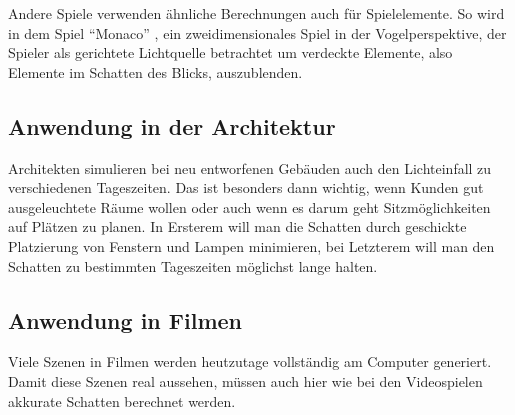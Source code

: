 Andere Spiele verwenden ähnliche Berechnungen auch für Spielelemente. So wird in dem Spiel "`Monaco"' \cite{monaco2014},
ein zweidimensionales Spiel in der Vogelperspektive, der Spieler als gerichtete Lichtquelle betrachtet um verdeckte
Elemente, also Elemente im Schatten des Blicks, auszublenden.

\subsection*{Anwendung in der Architektur}

Architekten simulieren bei neu entworfenen Gebäuden auch den Lichteinfall zu verschiedenen Tageszeiten.
Das ist besonders dann wichtig, wenn Kunden gut ausgeleuchtete Räume wollen oder auch wenn es darum geht
Sitzmöglichkeiten auf Plätzen zu planen. In Ersterem will man die Schatten durch geschickte Platzierung
von Fenstern und Lampen minimieren, bei Letzterem will man den Schatten zu bestimmten Tageszeiten
möglichst lange halten.

\subsection*{Anwendung in Filmen}

Viele Szenen in Filmen werden heutzutage vollständig am Computer generiert. Damit diese Szenen
real aussehen, müssen auch hier wie bei den Videospielen akkurate Schatten berechnet werden.
